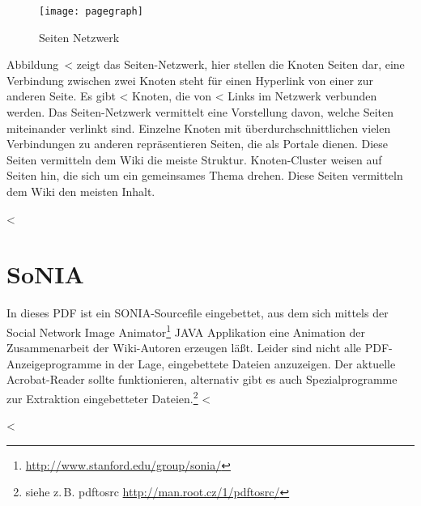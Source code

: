 \documentclass{scrartcl}
\begin{document}
\begin{figure}
	\centering
	\texttt{[image: pagegraph]}
	\caption{Seiten Netzwerk}
	\label{fig:page_network}
\end{figure}

Abbildung~<%
zeigt das Seiten-Netzwerk, hier stellen die Knoten Seiten dar, eine Verbindung zwischen zwei Knoten steht für einen Hyperlink von einer zur anderen Seite. Es gibt <%
Knoten, die von <%
Links im Netzwerk verbunden werden. Das Seiten-Netzwerk vermittelt eine Vorstellung davon, welche Seiten miteinander verlinkt sind. Einzelne Knoten mit überdurchschnittlichen vielen Verbindungen zu anderen repräsentieren Seiten, die als Portale dienen. Diese Seiten vermitteln dem Wiki die meiste Struktur.
Knoten-Cluster weisen auf Seiten hin, die sich um ein gemeinsames Thema drehen. Diese Seiten vermitteln dem Wiki den meisten Inhalt. 



<%

\section{SoNIA} %
\label{sec:sonia}

In dieses PDF ist ein SONIA-Sourcefile eingebettet, aus dem sich mittels der Social Network Image Animator\footnote{\url{http://www.stanford.edu/group/sonia/}} JAVA Applikation eine Animation der Zusammenarbeit der Wiki-Autoren erzeugen läßt. Leider sind nicht alle PDF-Anzeigeprogramme in der Lage, eingebettete Dateien anzuzeigen. Der aktuelle Acrobat-Reader sollte funktionieren, alternativ gibt es auch Spezialprogramme zur Extraktion eingebetteter Dateien.\footnote{siehe z.\,B. pdftosrc \textlangle\url{http://man.root.cz/1/pdftosrc/}\textrangle}
<%
\bigskip

<%


\clearpage
\end{document}
